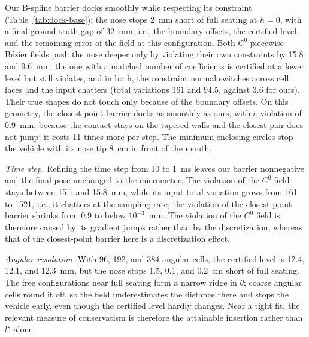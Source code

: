 \documentclass[journal]{IEEEtran}
\theoremstyle{definition}
\begin{document}
Our B-spline barrier docks smoothly while respecting its constraint (Table~\ref{tab:dock-base}): the
nose stops 2~mm short of full seating at $h=0$, with a final ground-truth gap of 32~mm, i.e., the
boundary offsets, the certified level, and the remaining error of the field at this configuration.
Both $C^0$ piecewise B\'ezier fields push the nose deeper only by violating their own constraints by
15.8 and 9.6~mm; the one with a matched number of coefficients is certified at a lower level but
still violates, and in both, the constraint normal switches across cell faces and the input chatters
(total variations 161 and 94.5, against 3.6 for ours). Their true shapes do not touch only because
of the boundary offsets. On this geometry, the closest-point barrier docks as smoothly as ours, with
a violation of 0.9~mm, because the contact stays on the tapered walls and the closest pair does not
jump; it costs 11 times more per step. The minimum enclosing circles stop the vehicle with its nose
tip 8~cm in front of the mouth.

\emph{Time step.} Refining the time step from 10 to 1~ms leaves our barrier nonnegative and the final
pose unchanged to the micrometer. The violation of the $C^0$ field stays between 15.1 and 15.8~mm,
while its input total variation grows from 161 to 1521, i.e., it chatters at the sampling rate; the
violation of the closest-point barrier shrinks from 0.9 to below $10^{-3}$~mm. The violation of the
$C^0$ field is therefore caused by its gradient jumps rather than by the discretization, whereas that
of the closest-point barrier here is a discretization effect.

\emph{Angular resolution.} With 96, 192, and 384 angular cells, the certified level is 12.4, 12.1,
and 12.3~mm, but the nose stops 1.5, 0.1, and 0.2~cm short of full seating. The free configurations
near full seating form a narrow ridge in $\theta$; coarse angular cells round it off, so the field
underestimates the distance there and stops the vehicle early, even though the certified level
hardly changes. Near a tight fit, the relevant measure of conservatism is therefore the attainable
insertion rather than $l^\star$ alone.
\end{document}
